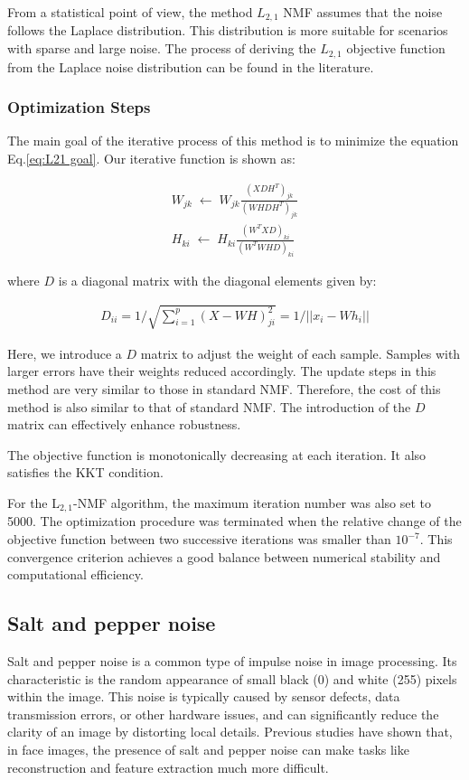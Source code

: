 From a statistical point of view, the method $L_{2,1}$ NMF assumes that the noise follows the Laplace distribution. This distribution is more suitable for scenarios with sparse and large noise. The process of deriving the $L_{2,1}$ objective function from the Laplace noise distribution can be found in the literature\cite{kong2011robust}.

\subsubsection{Optimization Steps}

The main goal of the iterative process of this method is to minimize the equation Eq.\eqref{eq:L21 goal}. Our iterative function is shown as:

\begin{align}
    W_{jk}\;\leftarrow\; W_{jk} \frac{(XDH^T)_{jk}}{(WHDH^T)_{jk}}\\
    H_{ki}\;\leftarrow\; H_{ki} \frac{(W^TXD)_{ki}}{(W^TWHD)_{ki}}
\end{align}

where $D$ is a diagonal matrix with the diagonal elements given by:

\begin{align}
    D_{ii} = 1/\sqrt{\sum_{i=1}^p(X-WH)_{ji}^2} = 1/||x_i-Wh_i||
\end{align}

Here, we introduce a $D$ matrix to adjust the weight of each sample. Samples with larger errors have their weights reduced accordingly. The update steps in this method are very similar to those in standard NMF. Therefore, the cost of this method is also similar to that of standard NMF. The introduction of the $D$ matrix can effectively enhance robustness.

The objective function is monotonically decreasing at each iteration. It also satisfies the KKT condition\cite{kong2011robust}.

For the L$_{2,1}$-NMF algorithm, the maximum iteration number was also set to 5000. The optimization procedure was terminated when the relative change of the objective function between two successive iterations was smaller than $10^{-7}$. This convergence criterion achieves a good balance between numerical stability and computational efficiency.


\subsection{Salt and pepper noise}
Salt and pepper noise is a common type of impulse noise in image processing. Its characteristic is the random appearance of small black (0) and white (255) pixels within the image. This noise is typically caused by sensor defects, data transmission errors, or other hardware issues, and can significantly reduce the clarity of an image by distorting local details. Previous studies have shown that, in face images, the presence of salt and pepper noise can make tasks like reconstruction and feature extraction much more difficult\cite{zhang2015inpainting,alazzeh2018salt}.

